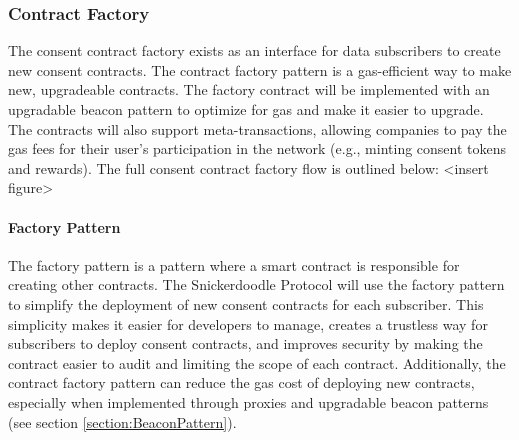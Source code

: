



\subsubsection{Contract Factory}
The consent contract factory exists as an interface for data subscribers to create new consent contracts. The contract factory pattern is a gas-efficient way to make new, upgradeable contracts. The factory contract will be implemented with an upgradable beacon pattern to optimize for gas and make it easier to upgrade. The contracts will also support meta-transactions, allowing companies to pay the gas fees for their user's participation in the network (e.g., minting consent tokens and rewards). The full consent contract factory flow is outlined below: <insert figure>

\paragraph{Factory Pattern}
The factory pattern is a pattern where a smart contract is responsible for creating other contracts. The Snickerdoodle Protocol will use the factory pattern to simplify the deployment of new consent contracts for each subscriber. This simplicity makes it easier for developers to manage, creates a trustless way for subscribers to deploy consent contracts, and improves security by making the contract easier to audit and limiting the scope of each contract. Additionally, the contract factory pattern can reduce the gas cost of deploying new contracts, especially when implemented through proxies and upgradable beacon patterns (see section \ref{section:BeaconPattern}).

